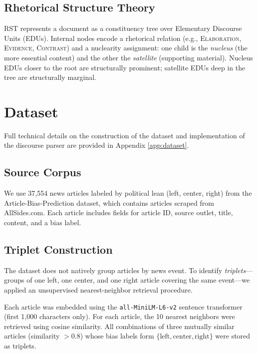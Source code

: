 \documentclass[11pt]{article}
\begin{document}
\subsection{Rhetorical Structure Theory}

RST represents a document as a constituency tree over Elementary Discourse Units (EDUs). Internal nodes encode a rhetorical relation (e.g., \textsc{Elaboration}, \textsc{Evidence}, \textsc{Contrast}) and a nuclearity assignment: one child is the \emph{nucleus} (the more essential content) and the other the \emph{satellite} (supporting material). Nucleus EDUs closer to the root are structurally prominent; satellite EDUs deep in the tree are structurally marginal.

\section{Dataset}
\label{sec:dataset}

Full technical details on the construction of the dataset and implementation of the discourse parser are provided in Appendix \ref{app:dataset}.

\subsection{Source Corpus}

We use 37,554 news articles labeled by political lean (left, center, right) from the Article-Bias-Prediction dataset, which contains articles scraped from AllSides.com. Each article includes fields for article ID, source outlet, title, content, and a bias label.

\subsection{Triplet Construction}

The dataset does not natively group articles by news event. To identify \emph{triplets}---groups of one left, one center, and one right article covering the same event---we applied an unsupervised nearest-neighbor retrieval procedure.

Each article was embedded using the \texttt{all-MiniLM-L6-v2} sentence transformer (first 1,000 characters only). For each article, the 10 nearest neighbors were retrieved using cosine similarity. All combinations of three mutually similar articles (similarity $> 0.8$) whose bias labels form $\{\text{left}, \text{center}, \text{right}\}$ were stored as triplets.
\end{document}
